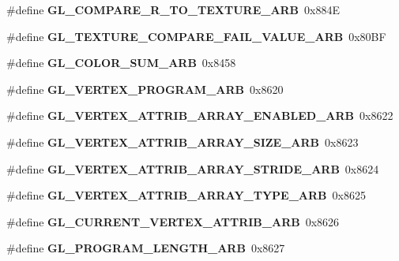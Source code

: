 \begin{DoxyCompactItemize}
\item 
\#define {\bfseries G\+L\+\_\+\+C\+O\+M\+P\+A\+R\+E\+\_\+\+R\+\_\+\+T\+O\+\_\+\+T\+E\+X\+T\+U\+R\+E\+\_\+\+A\+R\+B}~0x884\+E\label{_s_d_l__opengl_8h_af4d69081972263db4cfdfe5ad836e476}

\item 
\#define {\bfseries G\+L\+\_\+\+T\+E\+X\+T\+U\+R\+E\+\_\+\+C\+O\+M\+P\+A\+R\+E\+\_\+\+F\+A\+I\+L\+\_\+\+V\+A\+L\+U\+E\+\_\+\+A\+R\+B}~0x80\+B\+F\label{_s_d_l__opengl_8h_a55157956c685886952c7547ae7db602e}

\item 
\#define {\bfseries G\+L\+\_\+\+C\+O\+L\+O\+R\+\_\+\+S\+U\+M\+\_\+\+A\+R\+B}~0x8458\label{_s_d_l__opengl_8h_aec03f19ecb079e28e278fe2f2bc4e9ca}

\item 
\#define {\bfseries G\+L\+\_\+\+V\+E\+R\+T\+E\+X\+\_\+\+P\+R\+O\+G\+R\+A\+M\+\_\+\+A\+R\+B}~0x8620\label{_s_d_l__opengl_8h_ad7bcacc5d716c9b697d1af8f675ebabe}

\item 
\#define {\bfseries G\+L\+\_\+\+V\+E\+R\+T\+E\+X\+\_\+\+A\+T\+T\+R\+I\+B\+\_\+\+A\+R\+R\+A\+Y\+\_\+\+E\+N\+A\+B\+L\+E\+D\+\_\+\+A\+R\+B}~0x8622\label{_s_d_l__opengl_8h_ab0c8d4a94d427fc26d3cfea8ad421195}

\item 
\#define {\bfseries G\+L\+\_\+\+V\+E\+R\+T\+E\+X\+\_\+\+A\+T\+T\+R\+I\+B\+\_\+\+A\+R\+R\+A\+Y\+\_\+\+S\+I\+Z\+E\+\_\+\+A\+R\+B}~0x8623\label{_s_d_l__opengl_8h_a12dfc14fcd0b718af64b4726e2ef5518}

\item 
\#define {\bfseries G\+L\+\_\+\+V\+E\+R\+T\+E\+X\+\_\+\+A\+T\+T\+R\+I\+B\+\_\+\+A\+R\+R\+A\+Y\+\_\+\+S\+T\+R\+I\+D\+E\+\_\+\+A\+R\+B}~0x8624\label{_s_d_l__opengl_8h_ae19ac94f9452d930789a2d5c024cb629}

\item 
\#define {\bfseries G\+L\+\_\+\+V\+E\+R\+T\+E\+X\+\_\+\+A\+T\+T\+R\+I\+B\+\_\+\+A\+R\+R\+A\+Y\+\_\+\+T\+Y\+P\+E\+\_\+\+A\+R\+B}~0x8625\label{_s_d_l__opengl_8h_a85f6cec1279c8b32a355b23ad0ac0099}

\item 
\#define {\bfseries G\+L\+\_\+\+C\+U\+R\+R\+E\+N\+T\+\_\+\+V\+E\+R\+T\+E\+X\+\_\+\+A\+T\+T\+R\+I\+B\+\_\+\+A\+R\+B}~0x8626\label{_s_d_l__opengl_8h_a23aea7a14ad99161a2196c2317c25d1c}

\item 
\#define {\bfseries G\+L\+\_\+\+P\+R\+O\+G\+R\+A\+M\+\_\+\+L\+E\+N\+G\+T\+H\+\_\+\+A\+R\+B}~0x8627\label{_s_d_l__opengl_8h_a23301733f1a7e9626f1cf8cac242d3cb}


\end{DoxyCompactItemize}
